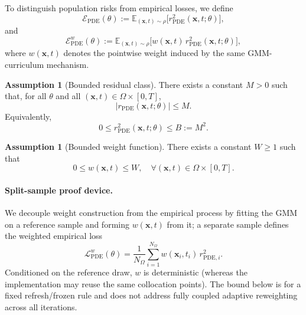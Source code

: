 \documentclass{article}
\theoremstyle{plain}
\theoremstyle{definition}
\newtheorem{assumption}[theorem]{Assumption}
\theoremstyle{remark}
\begin{document}
To distinguish population risks from empirical losses, we define
\begin{equation}
	\mathcal{E}_{\mathrm{PDE}}(\theta)
	:=
	\mathbb{E}_{(\boldsymbol{x},t)\sim \rho}
	\bigl[
	r_{\mathrm{PDE}}^2(\boldsymbol{x},t;\theta)
	\bigr],
	\label{eq:app_population_unweighted}
\end{equation}
and
\begin{equation}
	\mathcal{E}_{\mathrm{PDE}}^{w}(\theta)
	:=
	\mathbb{E}_{(\boldsymbol{x},t)\sim \rho}
	\bigl[
	w(\boldsymbol{x},t)\,
	r_{\mathrm{PDE}}^2(\boldsymbol{x},t;\theta)
	\bigr],
	\label{eq:app_population_weighted}
\end{equation}
where $w(\boldsymbol{x},t)$ denotes the pointwise weight induced by the
same GMM-curriculum mechanism.

\begin{assumption}[Bounded residual class]
	\label{ass:bounded_residual}
	There exists a constant $M>0$ such that, for all $\theta$ and all
	$(\boldsymbol{x},t)\in\Omega\times[0,T]$,
	\begin{equation}
		|r_{\mathrm{PDE}}(\boldsymbol{x},t;\theta)|\leqslant M.
		\label{eq:app_residual_bound}
	\end{equation}
	Equivalently,
	\begin{equation}
		0\leqslant
		r_{\mathrm{PDE}}^2(\boldsymbol{x},t;\theta)
		\leqslant
		B:=M^2.
		\label{eq:app_squared_residual_bound}
	\end{equation}
\end{assumption}

\begin{assumption}[Bounded weight function]
	\label{ass:bounded_weight_function}
	There exists a constant $W\geqslant 1$ such that
	\begin{equation}
		0\leqslant w(\boldsymbol{x},t)\leqslant W,
		\quad
		\forall (\boldsymbol{x},t)\in\Omega\times[0,T].
		\label{eq:app_weight_function_bound}
	\end{equation}
\end{assumption}

\paragraph{Split-sample proof device.}
We decouple weight construction from the empirical process by fitting the
GMM on a reference sample and forming $w(\boldsymbol{x},t)$ from it; a
separate sample defines the weighted empirical loss
\begin{equation}
	\mathcal{L}_{\mathrm{PDE}}^{w}(\theta)
	=
	\frac{1}{N_{\Omega}}
	\sum_{i=1}^{N_{\Omega}}
	w(\boldsymbol{x}_i,t_i)\,
	r_{\mathrm{PDE},i}^{2}.
	\label{eq:app_empirical_weighted_loss}
\end{equation}
Conditioned on the reference draw, $w$ is deterministic (whereas the
implementation may reuse the same collocation points).
The bound below is for a fixed refresh/frozen rule and does not address
fully coupled adaptive reweighting across all iterations.
\end{document}
